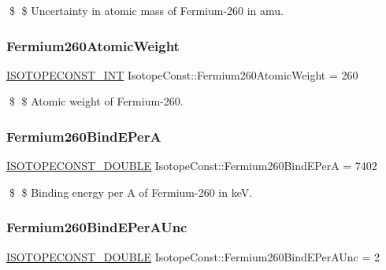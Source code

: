 \$ \$ Uncertainty in atomic mass of Fermium-\/260 in amu. \mbox{\label{group___isotope_const-_fermium-_fm260_ga1867e2e657609789387e9d1523959737}} 
\subsubsection{\texorpdfstring{Fermium260\+Atomic\+Weight}{Fermium260AtomicWeight}}
{\footnotesize\ttfamily \mbox{\hyperlink{group___isotope_const-_macros_ga5f18360b3e99483a35c32d789e62621c}{I\+S\+O\+T\+O\+P\+E\+C\+O\+N\+S\+T\+\_\+\+I\+NT}} Isotope\+Const\+::\+Fermium260\+Atomic\+Weight = 260}

\$ \$ Atomic weight of Fermium-\/260. \mbox{\label{group___isotope_const-_fermium-_fm260_ga7b01b5538e9e0c7c071073ff738284d2}} 
\subsubsection{\texorpdfstring{Fermium260\+Bind\+E\+PerA}{Fermium260BindEPerA}}
{\footnotesize\ttfamily \mbox{\hyperlink{group___isotope_const-_macros_ga8f45a7272ce02c0b4c65c44636ed719a}{I\+S\+O\+T\+O\+P\+E\+C\+O\+N\+S\+T\+\_\+\+D\+O\+U\+B\+LE}} Isotope\+Const\+::\+Fermium260\+Bind\+E\+PerA = 7402}

\$ \$ Binding energy per A of Fermium-\/260 in keV. \mbox{\label{group___isotope_const-_fermium-_fm260_gad099189298271fe66a93fbda7613497e}} 
\subsubsection{\texorpdfstring{Fermium260\+Bind\+E\+Per\+A\+Unc}{Fermium260BindEPerAUnc}}
{\footnotesize\ttfamily \mbox{\hyperlink{group___isotope_const-_macros_ga8f45a7272ce02c0b4c65c44636ed719a}{I\+S\+O\+T\+O\+P\+E\+C\+O\+N\+S\+T\+\_\+\+D\+O\+U\+B\+LE}} Isotope\+Const\+::\+Fermium260\+Bind\+E\+Per\+A\+Unc = 2}

